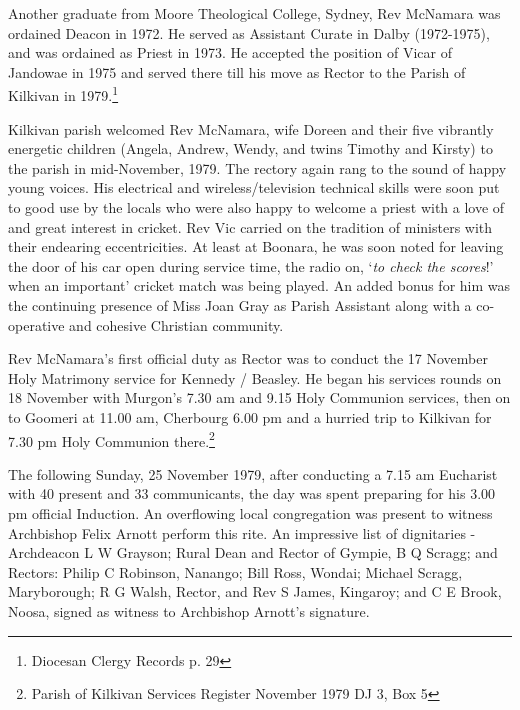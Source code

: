 Another graduate from Moore Theological College, Sydney, Rev McNamara was ordained Deacon in 1972. He served as Assistant Curate in Dalby (1972-1975), and was ordained as Priest in 1973. He accepted the position of Vicar of Jandowae in 1975 and served there till his move as Rector to the Parish of Kilkivan in 1979.\footnote{Diocesan Clergy Records p. 29}


Kilkivan parish welcomed Rev McNamara, wife Doreen and their five vibrantly energetic children (Angela, Andrew, Wendy, and twins Timothy and Kirsty) to the parish in mid-November, 1979. The rectory again rang to the sound of happy young voices. His electrical and wireless/television technical skills were soon put to good use by the locals who were also happy to welcome a priest with a love of and great interest in cricket. Rev Vic carried on the tradition of ministers with their endearing eccentricities. At least at Boonara, he was soon noted for leaving the door of his car open during service time, the radio on, `\emph{to check the scores}!' when an important' cricket match was being played. An added bonus for him was the continuing presence of Miss Joan Gray as Parish Assistant along with a co-operative and cohesive Christian community.



Rev McNamara's first official duty as Rector was to conduct the 17 November Holy Matrimony service for Kennedy / Beasley. He began his services rounds on 18 November with Murgon's 7.30 am and 9.15 Holy Communion services, then on to Goomeri at 11.00 am, Cherbourg 6.00 pm and a hurried trip to Kilkivan for 7.30 pm Holy Communion there.\footnote{Parish of Kilkivan Services Register November 1979 DJ 3, Box 5}


The following Sunday, 25 November 1979, after conducting a 7.15 am Eucharist with 40 present and 33 communicants, the day was spent preparing for his 3.00 pm official Induction. An overflowing local congregation was present to witness Archbishop Felix Arnott perform this rite. An impressive list of dignitaries - Archdeacon L W Grayson; Rural Dean and Rector of Gympie, B Q Scragg; and Rectors: Philip C Robinson, Nanango; Bill Ross, Wondai; Michael Scragg, Maryborough; R G Walsh, Rector, and Rev S James, Kingaroy; and C E Brook, Noosa, signed as witness to Archbishop Arnott's signature.



